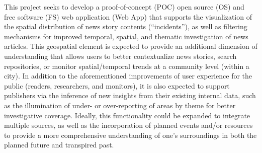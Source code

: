 This project seeks to develop a proof-of-concept (POC) open source (OS) and free software (FS) web application (Web App) that supports the visualization of the spatial distribution of news story contents (“incidents”), as well as filtering mechanisms for improved temporal, spatial, and thematic investigation of news articles. This geospatial element is expected to provide an additional dimension of understanding that allows users to better contextualize news stories, search repositories, or monitor spatial/temporal trends at a community level (within a city). In addition to the aforementioned improvements of user experience for the public (readers, researchers, and monitors), it is also expected to support publishers via the inference of new insights from their existing internal data, such as the illumination of under- or over-reporting of areas by theme for better investigative coverage. Ideally, this functionality could be expanded to integrate multiple sources, as well as the incorporation of planned events and/or resources to provide a more comprehensive understanding of one's surroundings in both the planned future and transpired past.
